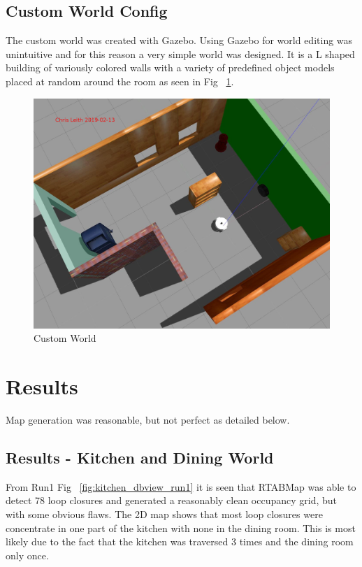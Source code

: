 \documentclass[10pt,journal,compsoc]{IEEEtran}
\begin{document}
\subsection{Custom World Config}
The custom world was created with Gazebo. Using Gazebo for world editing was unintuitive and for this reason a very simple world was designed. It is a L shaped building of variously colored walls with a variety of predefined object models placed at random around the room as seen in Fig ~\ref{fig:customworld}.

\begin{figure}[h]
      \centering
      \includegraphics[width=\linewidth]{Assets/custom_gazebo_world.jpg}
      \caption{Custom World}
      \label{fig:customworld}
\end{figure}

\section{Results}
Map generation was reasonable, but not perfect as detailed below.
\subsection{Results - Kitchen and Dining World}
From Run1 Fig ~\ref{fig:kitchen_dbview_run1} it is seen that RTABMap was able to detect 78 loop closures and generated a reasonably clean occupancy grid, but with some obvious flaws. The 2D map shows that most loop closures were concentrate in one part of the kitchen with none in the dining room. This is most likely due to the fact that the kitchen was traversed 3 times and the dining room only once.
\end{document}
